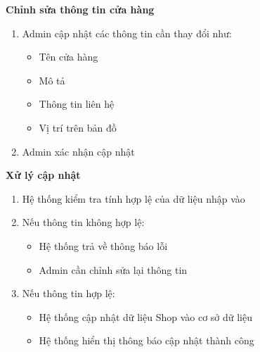 \textbf{Chỉnh sửa thông tin cửa hàng}

\begin{enumerate}[noitemsep]
    \item Admin cập nhật các thông tin cần thay đổi như:
    \begin{itemize}[noitemsep]
        \item Tên cửa hàng
        \item Mô tả
        \item Thông tin liên hệ
        \item Vị trí trên bản đồ
    \end{itemize}
    
    \item Admin xác nhận cập nhật
\end{enumerate}

\textbf{Xử lý cập nhật}

\begin{enumerate}[noitemsep]
    \item Hệ thống kiểm tra tính hợp lệ của dữ liệu nhập vào
    
    \item Nếu thông tin không hợp lệ:
    \begin{itemize}[noitemsep]
        \item Hệ thống trả về thông báo lỗi
        \item Admin cần chỉnh sửa lại thông tin
    \end{itemize}
    
    \item Nếu thông tin hợp lệ:
    \begin{itemize}[noitemsep]
        \item Hệ thống cập nhật dữ liệu Shop vào cơ sở dữ liệu
        \item Hệ thống hiển thị thông báo cập nhật thành công
    \end{itemize}
\end{enumerate}
